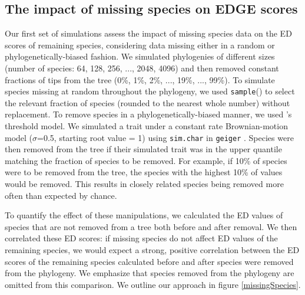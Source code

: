 \documentclass[10pt,english]{article}
\begin{document}
\subsection*{The impact of missing species on EDGE scores}
Our first set of simulations assess the impact of missing species data on the ED
scores of remaining species, considering data missing either in a random or
phylogenetically-biased fashion. We simulated phylogenies of different sizes
(number of species: 64, 128, 256, ..., 2048, 4096) and then removed constant
fractions of tips from the tree (0\%, 1\%, 2\%, ..., 19\%, ..., 99\%). To
simulate species missing at random throughout the phylogeny, we used
\texttt{sample}() to select the relevant fraction of species (rounded to the
nearest whole number) without replacement. To remove species in a
phylogenetically-biased manner, we used \textcite{Felsenstein2005}'s threshold
model. We simulated a trait under a constant rate Brownian-motion model
($\sigma$=0.5, starting root value = 1) using \texttt{sim.char} in
\texttt{geiger} \autocite{Pennell2014}. Species were then removed from the tree
if their simulated trait was in the upper quantile matching the fraction of
species to be removed. For example, if 10\% of species were to be removed from
the tree, the species with the highest 10\% of values would be removed. This
results in closely related species being removed more often than expected by
chance.

To quantify the effect of these manipulations, we calculated the ED values of
species that are not removed from a tree both before and after removal. We then
correlated these ED scores: if missing species do not affect ED values of the
remaining species, we would expect a strong, positive correlation between the ED
scores of the remaining species calculated before and after species were removed
from the phylogeny. We emphasize that species removed from the phylogeny are
omitted from this comparison. We outline our approach in figure
\ref{missingSpecies}.
\end{document}
